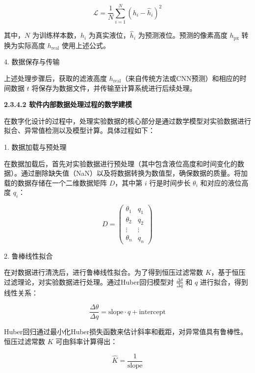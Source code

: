 \begin{equation}
\mathcal{L} = \frac{1}{N} \sum_{i=1}^{N} (h_i - \hat{h}_i)^2
\end{equation}

其中，\( N \) 为训练样本数，\( h_i \) 为真实液位，\( \hat{h}_i \) 为预测液位。预测的像素高度 \( h_{\text{px}} \) 转换为实际高度 \( h_{\text{real}} \) 使用上述公式。

4. 数据保存与传输

上述处理步骤后，获取的滤液高度 \( h_{\text{real}} \)（来自传统方法或CNN预测）和相应的时间数据 \( t \) 将保存为数据文件，并传输至计算系统进行后续处理。

{\noindent \wuhao \rmfamily {} \textbf{2.3.4.2 \quad 软件内部数据处理过程的数学建模}}

在数字化设计的过程中，处理实验数据的核心部分是通过数学模型对实验数据进行拟合、异常值检测以及模型计算。具体过程如下：

1. 数据加载与预处理

在数据加载后，首先对实验数据进行预处理（其中包含液位高度和时间变化的数据）。通过删除缺失值（NaN）以及将数据转换为数值型，确保数据的质量。将加载的数据存储在一个二维数据矩阵 \( D \)，其中第 \( i \) 行是时间步长 \( \theta_i \) 和对应的液位高度 \( q_i \)：

\begin{equation}
D = \begin{pmatrix}
\theta_1 & q_1 \\
\theta_2 & q_2 \\
\vdots & \vdots \\
\theta_n & q_n
\end{pmatrix}
\end{equation}

2. 鲁棒线性拟合

在对数据进行清洗后，进行鲁棒线性拟合。为了得到恒压过滤常数 \( K \)，基于恒压过滤理论，对实验数据进行处理。通过Huber回归模型\textsuperscript{\cite{ref23}}对 \( \frac{\Delta \theta}{\Delta q} \) 和 \( q \) 进行拟合，得到线性关系：

\begin{equation}
\frac{\Delta \theta}{\Delta q} = \text{slope} \cdot q + \text{intercept}
\end{equation}

Huber回归通过最小化Huber损失函数来估计斜率和截距，对异常值具有鲁棒性。恒压过滤常数 \( K \) 可由斜率计算得出：

\begin{equation}
\hat{K} = \frac{1}{\text{slope}}
\end{equation}

